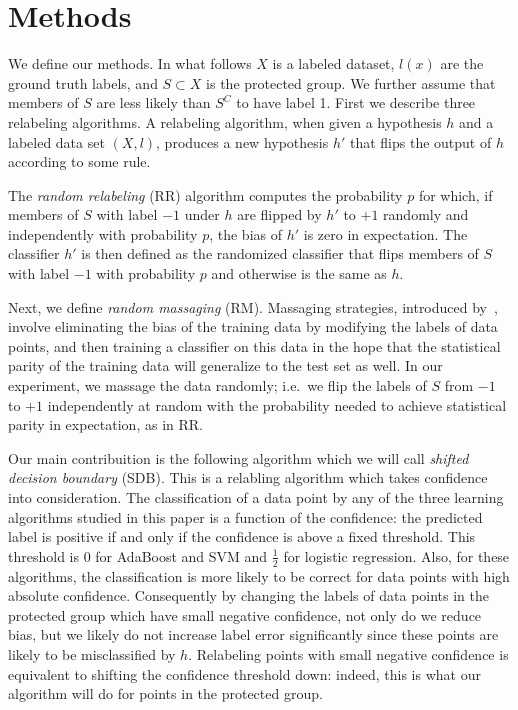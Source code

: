 \documentclass[conference]{IEEEtran}
\begin{document}
\section{Methods} \label{sec:methods}

We define our methods. In what follows $X$ is a labeled dataset, $l(x)$ are the
ground truth labels, and $S \subset X$ is the protected group.  We further
assume that members of $S$ are less likely than $S^C$ to have label 1.  First
we describe three relabeling algorithms.  A relabeling algorithm, when given a
hypothesis $h$ and a labeled data set $(X, l)$, produces a new hypothesis $h'$
that flips the output of $h$ according to some rule.

The \emph{random relabeling} (RR) algorithm computes the probability
$p$ for which, if members of $S$ with label $-1$ under $h$ are flipped by $h'$
to $+1$ randomly and independently with probability $p$, the bias of $h'$ is
zero in expectation. The classifier $h'$ is then defined as the randomized
classifier that flips members of $S$ with label $-1$ with probability $p$ and
otherwise is the same as $h$.

Next, we define \emph{random massaging} (RM).  Massaging strategies, introduced
by~\cite{KamiranC09}, involve eliminating the bias of the training data by
modifying the labels of data points, and then training a classifier on this
data in the hope that the statistical parity of the training data will
generalize to the test set as well.  In our experiment, we massage the data
randomly; i.e.~we flip the labels of $S$ from $-1$ to $+1$ independently at
random with the probability needed to achieve statistical parity in
expectation, as in RR.

Our main contribuition is the following algorithm which we will call
\emph{shifted decision boundary} (SDB).  This is a relabling algorithm which
takes confidence into consideration.  The classification of a data point by any
of the three learning algorithms studied in this paper is a function of the
confidence: the predicted label is positive if and only if the confidence is
above a fixed threshold. This threshold is $0$ for AdaBoost and SVM and
$\frac12$ for logistic regression.  Also, for these algorithms, the
classification is more likely to be correct for data points with high absolute
confidence. Consequently by changing the labels of data points in the
protected group which have small negative confidence, not only do we reduce
bias, but we likely do not increase label error significantly since these
points are likely to be misclassified by $h$.  Relabeling points with small
negative confidence is equivalent to shifting the confidence threshold down:
indeed, this is what our algorithm will do for points in the protected group.
\end{document}
